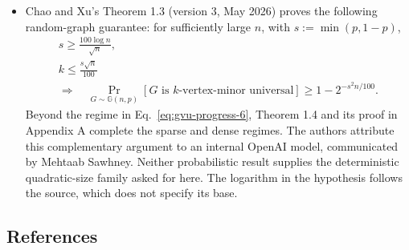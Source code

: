 \begin{itemize}
  \item Chao and Xu's Theorem 1.3 (version 3, May 2026) proves the following random-graph guarantee: for sufficiently large $n$, with $s:=\min(p,1-p)$,
  \begin{equation}
\begin{gathered}
s\geq\frac{100\log n}{\sqrt n},
  \\

  k\leq\frac{s\sqrt n}{100}
  \\
\Longrightarrow\quad
  \Pr_{G\sim\mathbb G(n,p)}
  [G\text{ is }k\text{-vertex-minor universal}]
  \geq1-2^{-s^2n/100}.
\end{gathered}
\label{eq:gvu-progress-6}
\end{equation}
  Beyond the regime in Eq.~\eqref{eq:gvu-progress-6}, Theorem 1.4 and its proof in Appendix A complete the sparse and dense regimes. The authors attribute this complementary argument to an internal OpenAI model, communicated by Mehtaab Sawhney. Neither probabilistic result supplies the deterministic quadratic-size family asked for here. The logarithm in the hypothesis follows the source, which does not specify its base. 
\end{itemize}

\subsection*{References}

